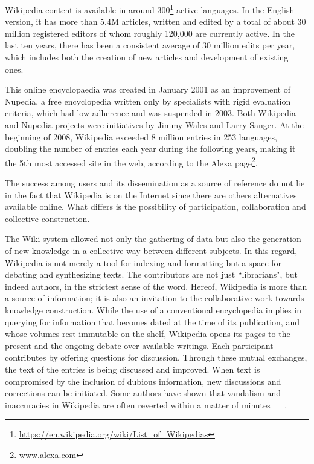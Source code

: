 Wikipedia content is available in around 300\footnote{\url{https://en.wikipedia.org/wiki/List_of_Wikipedias}} active languages. In the English version, it has more than 5.4M articles,  written and edited by a total of about 30 million registered editors of whom roughly 120,000 are currently active. In the last ten years, there has been a consistent average of 30 million edits per year, which includes both the creation of new articles and development of existing ones. 

This online encyclopaedia was created in January 2001 as an improvement of Nupedia, a free encyclopedia written only by specialists with rigid evaluation criteria, which had low adherence and was suspended in 2003.
Both Wikipedia and Nupedia projects were initiatives by Jimmy Wales and Larry Sanger. At the beginning of 2008, Wikipedia exceeded 8 million entries in 253 languages, doubling the number of entries each year during the following years, making it the 5th most accessed site in the web, according to the Alexa page\footnote{\url{www.alexa.com}}.

The success among users and its dissemination as a source of reference do not lie in the fact that Wikipedia is on the Internet since there are others alternatives available online. What differs is the possibility of participation, collaboration and collective construction. 


The Wiki system allowed not only the gathering of data but also the generation of new knowledge in a collective way between different subjects. In this regard, Wikipedia is not merely a tool for indexing and formatting but a space for debating and synthesizing texts. The contributors are not just ``librarians", but indeed authors, in the strictest sense of the word.  Hereof, Wikipedia is more than a source of information; it is also an invitation to the collaborative work towards knowledge construction. While the use of a conventional encyclopedia implies in querying for information that becomes dated at the time of its publication, and whose volumes rest immutable on the shelf, Wikipedia opens its pages to the present and the ongoing debate over available writings. Each participant contributes by offering questions for discussion. Through these mutual exchanges, the text of the entries is being discussed and improved. When text is compromised by the inclusion of dubious information, new discussions and corrections can be initiated.
Some authors have shown that vandalism and inaccuracies in Wikipedia are often reverted within a matter of minutes ~\cite{kittur2007he} ~\cite{viegas2004studying}.

